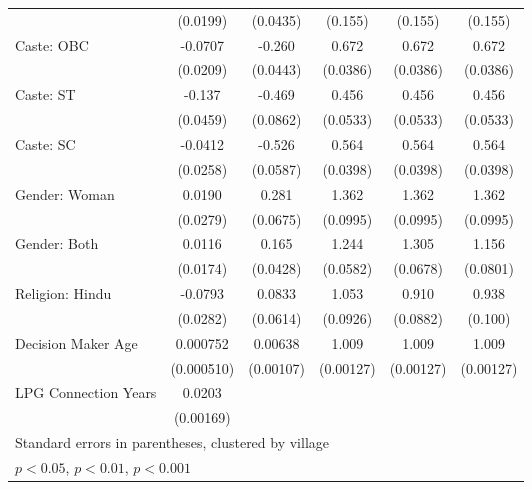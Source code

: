 {\begin{tabular}{l*{5}{c}}
                    &    (0.0199)         &    (0.0435)       &     (0.155)         &     (0.155)         &     (0.155)         \\
[1em]
Caste: OBC             &     -0.0707\sym{***}&      -0.260\sym{***}&       0.672\sym{***}&       0.672\sym{***}&       0.672\sym{***}\\
                     &    (0.0209)         &    (0.0443)         &    (0.0386)         &    (0.0386)         &    (0.0386)         \\
[1em]
Caste: ST             &      -0.137\sym{**} &      -0.469\sym{***} &       0.456\sym{***}&       0.456\sym{***}&       0.456\sym{***}\\
                   &    (0.0459)         &    (0.0862)          &    (0.0533)         &    (0.0533)         &    (0.0533)         \\
Caste: SC            &     -0.0412         &      -0.526\sym{***} &       0.564\sym{***}&       0.564\sym{***}&       0.564\sym{***}\\
                    &    (0.0258)         &    (0.0587)         &    (0.0398)         &    (0.0398)         &    (0.0398)         \\
[1em]
Gender: Woman   &      0.0190         &       0.281\sym{***}&       1.362\sym{***}&       1.362\sym{***}&       1.362\sym{***}\\
                    &    (0.0279)         &    (0.0675)         &    (0.0995)         &    (0.0995)         &    (0.0995)         \\
[1em]
Gender: Both          &      0.0116         &       0.165\sym{***} &       1.244\sym{***}&       1.305\sym{***}&       1.156\sym{*}  \\
                    &    (0.0174)         &    (0.0428)        &    (0.0582)         &    (0.0678)         &    (0.0801)         \\
[1em]
Religion: Hindu       &     -0.0793\sym{**} &      0.0833           &       1.053         &       0.910         &       0.938         \\
                    &    (0.0282)         &    (0.0614)        &    (0.0926)         &    (0.0882)         &     (0.100)         \\
[1em]
Decision Maker Age         &    0.000752         &     0.00638\sym{***}&       1.009\sym{***}&       1.009\sym{***}&       1.009\sym{***}\\
                    &  (0.000510)         &   (0.00107)         &   (0.00127)         &   (0.00127)         &   (0.00127)         \\
[1em] 
LPG Connection Years &      0.0203\sym{***}&                     &                     &                     &                     \\
                    &   (0.00169)         &                     &                     &                     &                     \\
                  
\hline\hline
\multicolumn{6}{l}{\footnotesize Standard errors in parentheses, clustered by village}\\
\multicolumn{6}{l}{\footnotesize \sym{*} \(p<0.05\), \sym{**} \(p<0.01\), \sym{***} \(p<0.001\)}\\
\end{tabular}%
}